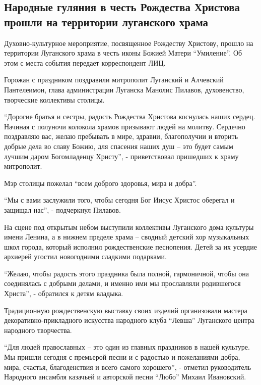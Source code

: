  
 
 
 
 
\subsection{Народные гуляния в честь Рождества Христова прошли на территории луганского храма}
\label{sec:07_01_2022.stz.news.lnr.lug_info.1.guljania_rozhdestvo_lugansk_hram}


Духовно-культурное мероприятие, посвященное Рождеству Христову, прошло на
территории Луганского храма в честь иконы Божией Матери \enquote{Умиление}. Об этом с
места события передает корреспондент ЛИЦ.

Горожан с праздником поздравили митрополит Луганский и Алчевский Пантелеимон,
глава администрации Луганска Манолис Пилавов, духовенство, творческие
коллективы столицы.

\enquote{Дорогие братья и сестры, радость Рождества Христова коснулась наших сердец.
Начиная с полуночи колокола храмов призывают людей на молитву. Сердечно
поздравляю вас, желаю пребывать в мире, здравии, благополучии и вторить добрые
дела во славу Божию, для спасения наших душ – это будет самым лучшим даром
Богомладенцу Христу}, - приветствовал пришедших к храму митрополит.

Мэр столицы пожелал \enquote{всем доброго здоровья, мира и добра}.

\enquote{Мы с вами заслужили того, чтобы сегодня Бог Иисус Христос оберегал и защищал
нас}, - подчеркнул Пилавов.

На сцене под открытым небом выступили коллективы Луганского дома культуры имени
Ленина, а в нижнем пределе храма – сводный детский хор музыкальных школ города,
который исполнил рождественские песнопения. Детей за их усердие архиерей
угостил новогодними сладкими подарками.

\enquote{Желаю, чтобы радость этого праздника была полной, гармоничной, чтобы она
соединялась с добрыми делами, и именно ими мы прославляли родившегося Христа},
- обратился к детям владыка.

Традиционную рождественскую выставку своих изделий организовали мастера
декоративно-прикладного искусства народного клуба \enquote{Левша} Луганского центра
народного творчества.

\enquote{Для людей православных – это один из главных праздников в нашей культуре. Мы
пришли сегодня с премьерой песни и с радостью и пожеланиями добра, мира,
счастья, благоденствия и всего самого хорошего}, - отметил руководитель
Народного ансамбля казачьей и авторской песни \enquote{Любо} Михаил Ивановский.
